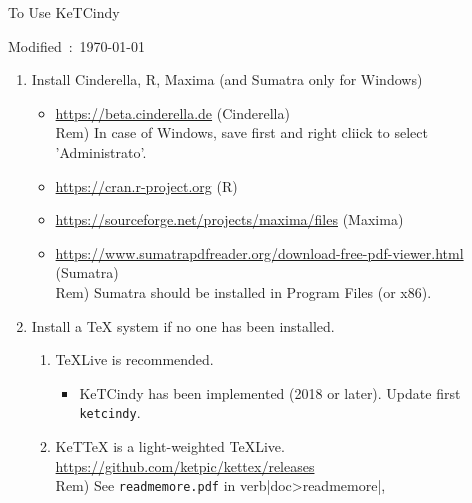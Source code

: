 \documentclass{article}
\begin{document}
\begin{center}
To Use KeTCindy 
\end{center}

\hfill Modified\ :\ \today

\begin{enumerate}[\bf\large 1.]\vspace{-1mm}
\item Install Cinderella, R, Maxima (and Sumatra only for Windows)\vspace{-1mm}
 \begin{itemize}
 \item \url{https://beta.cinderella.de}  (Cinderella)\\
\hspace*{6mm}Rem) In case of Windows, save first and right cliick to select 'Administrato'.\vspace{-1mm}
 \item \url{https://cran.r-project.org}   (R)\vspace{-1mm}
 \item \url{https://sourceforge.net/projects/maxima/files}  (Maxima)\vspace{-1mm}
 \item \url{https://www.sumatrapdfreader.org/download-free-pdf-viewer.html} (Sumatra)\\
\hspace*{5mm}Rem) Sumatra should be installed in Program Files (or x86).\vspace{-1mm}
 \end{itemize}
\item Install a TeX system if no one has been installed.\vspace{-1mm}
 \begin{enumerate}[(1)]
 \item TeXLive is recommended.\vspace{-1mm}
    \begin{itemize}
    \item KeTCindy has been implemented (2018 or later). Update first \verb|ketcindy|.\vspace{-1mm}
    \end{itemize}
 \item KeTTeX is a light-weighted TeXLive.\\
\hspace*{3mm}\url{https://github.com/ketpic/kettex/releases}\\
    \hspace*{6mm}Rem) See \verb|readmemore.pdf| in verb|doc>readmemore|,\vspace{-1mm}


\end{enumerate}
\end{enumerate}
\end{document}
